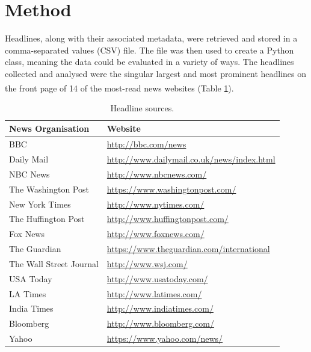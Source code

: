 \documentclass[a4paper,12pt]{article}
\begin{document}
\section{Method}
Headlines, along with their associated metadata, were retrieved and stored in a comma-separated values (CSV) file. The file was then used to create a Python class, meaning the data could be evaluated in a variety of ways.
The headlines collected and analysed were the singular largest and most prominent headlines on the front page of 14 of the most-read\textsuperscript{\cite{top_news_sites}} news websites (Table \ref{tab:headline_sources}).

\begin{table}[H]
    \centering
    \caption{Headline sources.}
    \begin{tabular}{ll}
        \hline
        \textbf{News Organisation} & \textbf{Website} \\ 
        \hline
        BBC                     & \url{http://bbc.com/news} \\
        Daily Mail              & \url{http://www.dailymail.co.uk/news/index.html} \\
        NBC News                & \url{http://www.nbcnews.com/} \\
        The Washington Post     & \url{https://www.washingtonpost.com/} \\
        New York Times          & \url{http://www.nytimes.com/} \\
        The Huffington Post     & \url{http://www.huffingtonpost.com/} \\
        Fox News                & \url{http://www.foxnews.com/} \\
        The Guardian            & \url{https://www.theguardian.com/international} \\
        The Wall Street Journal & \url{http://www.wsj.com/} \\
        USA Today               & \url{http://www.usatoday.com/} \\
        LA Times                & \url{http://www.latimes.com/} \\
        India Times             & \url{http://www.indiatimes.com/} \\
        Bloomberg               & \url{http://www.bloomberg.com/} \\
        Yahoo                   & \url{https://www.yahoo.com/news/} \\
        \hline
    \end{tabular}
    \label{tab:headline_sources}
\end{table}
\end{document}
